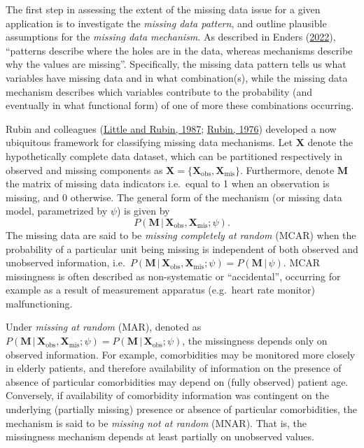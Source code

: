 \documentclass[
  letterpaper,
  DIV=11,
  numbers=noendperiod]{scrreprt}
\newcommand{\given}{\,|\,}
\begin{document}
The first step in assessing the extent of the missing data issue for a
given application is to investigate the \emph{missing data pattern}, and
outline plausible assumptions for the \emph{missing data mechanism}. As
described in Enders
(\protect\hyperlink{ref-endersAppliedMissingData2022}{2022}), ``patterns
describe where the holes are in the data, whereas mechanisms describe
why the values are missing''. Specifically, the missing data pattern
tells us what variables have missing data and in what combination(s),
while the missing data mechanism describes which variables contribute to
the probability (and eventually in what functional form) of one of more
these combinations occurring.

Rubin and colleagues
(\protect\hyperlink{ref-little1987statistical}{Little and Rubin, 1987};
\protect\hyperlink{ref-rubinInferenceMissingData1976}{Rubin, 1976})
developed a now ubiquitous framework for classifying missing data
mechanisms. Let \(\mathbf{X}\) denote the hypothetically complete data
dataset, which can be partitioned respectively in observed and missing
components as
\(\mathbf{X} = \{\mathbf{X}_{\text{obs}},\mathbf{X}_{\text{mis}}\}\).
Furthermore, denote \(\mathbf{M}\) the matrix of missing data indicators
i.e.~equal to 1 when an observation is missing, and 0 otherwise. The
general form of the mechanism (or missing data model, parametrized by
\(\psi\)) is given by \[
P(\mathbf{M} \given \mathbf{X}_{\text{obs}},\mathbf{X}_{\text{mis}};\psi).
\] The missing data are said to be \emph{missing completely at random}
(MCAR) when the probability of a particular unit being missing is
independent of both observed and unobserved information,
i.e.~\(P(\mathbf{M} \given \mathbf{X}_{\text{obs}},\mathbf{X}_{\text{mis}};\psi) = P(\mathbf{M} \given \psi)\).
MCAR missingness is often described as non-systematic or ``accidental'',
occurring for example as a result of measurement apparatus (e.g.~heart
rate monitor) malfunctioning.

Under \emph{missing at random} (MAR), denoted as
\(P(\mathbf{M} \given \mathbf{X}_{\text{obs}},\mathbf{X}_{\text{mis}};\psi) = P(\mathbf{M} \given \mathbf{X}_{\text{obs}};\psi)\),
the missingness depends only on observed information. For example,
comorbidities may be monitored more closely in elderly patients, and
therefore availability of information on the presence of absence of
particular comorbidities may depend on (fully observed) patient age.
Conversely, if availability of comorbidity information was contingent on
the underlying (partially missing) presence or absence of particular
comorbidities, the mechanism is said to be \emph{missing not at random}
(MNAR). That is, the missingness mechanism depends at least partially on
unobserved values.
\end{document}
